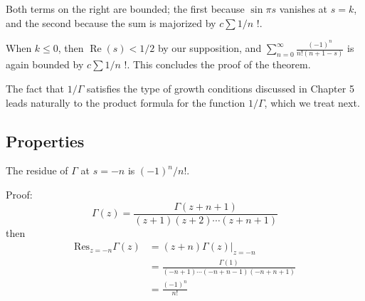 \documentclass[12pt, oneside]{book}
\begin{document}
\begin{theorem}
    Both terms on the right are bounded; the first because $\sin \pi s$ vanishes at $s=k$, and the second because the sum is majorized by $c \sum 1 / n$ !.

    When $k \leq 0$, then $\operatorname{Re}(s)<1 / 2$ by our supposition, and $\sum_{n=0}^{\infty} \frac{(-1)^n}{n!(n+1-s)}$ is again bounded by $c \sum 1 / n$ !. This concludes the proof of the theorem.

    The fact that $1 / \Gamma$ satisfies the type of growth conditions discussed in Chapter 5 leads naturally to the product formula for the function $1 / \Gamma$, which we treat next.
\end{theorem}
\subsection{Properties}
\begin{theorem}
    The residue of $\Gamma$ at $s=-n$ is $(-1)^n / n!$.

    Proof:
    $$\Gamma(z)= \frac{\Gamma(z+n+1)}{(z+1) (z+2)\cdots (z+n+1)} $$
    then
    $$\begin{aligned}
            \mathrm{Res}_{z=-n}\Gamma(z) &
            =(z+n)\Gamma(z)|_{z=-n}                                                            \\
                                         & =\frac{\Gamma(1)}{(-n+1) \cdots (-n+n-1) (-n +n+1)} \\
                                         & = \frac{(-1)^n}{n!}
        \end{aligned}
    $$
\end{theorem}
\end{document}
